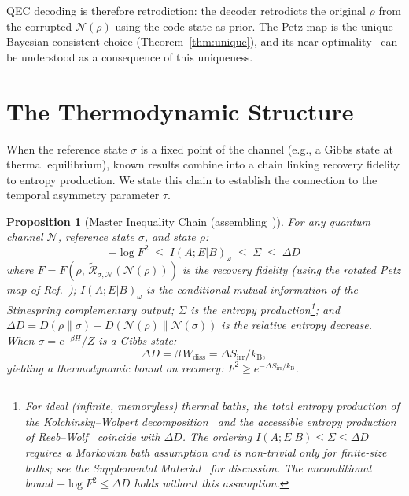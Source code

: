 \documentclass[prl,twocolumn,superscriptaddress,longbibliography,floatfix]{revtex4-2}
\newtheorem*{proposition}{Proposition}
\newcommand{\kB}{k_{\mathrm{B}}}
\newcommand{\Petz}{\mathcal{R}}
\newcommand{\chan}{\mathcal{N}}
\newcommand{\tauasym}{\tau}
\begin{document}
QEC decoding is therefore retrodiction: the decoder
retrodicts the original $\rho$ from the corrupted
$\chan(\rho)$ using the code state as prior.  The Petz map is the
unique Bayesian-consistent choice
(Theorem~\ref{thm:unique}), and its
near-optimality~\cite{Barnum2002} can be understood as a
consequence of this uniqueness.

\section{The Thermodynamic Structure}
\label{sec:thermo}

When the reference state $\sigma$ is a fixed point of the channel
(e.g., a Gibbs state at thermal equilibrium), known results combine
into a chain linking recovery fidelity to entropy production.  We
state this chain to establish the connection to the temporal
asymmetry parameter $\tauasym$.

\begin{proposition}[Master Inequality Chain
  (assembling~\cite{Junge2018,Fawzi2015,Kolchinsky2017,ReebWolf2014})]
\label{thm:master}
For any quantum channel $\chan$, reference state $\sigma$, and state
$\rho$:
\begin{equation}
\boxed{
-\!\log F^2 \;\leq\; I(A;E|B)_\omega
\;\leq\; \Sigma
\;\leq\; \Delta D
}
\label{eq:master}
\end{equation}
where $F = F(\rho,\,\tilde{\Petz}_{\sigma,\chan}(\chan(\rho)))$ is the recovery
fidelity (using the rotated Petz map of Ref.~\cite{Junge2018}); $I(A;E|B)_\omega$ is the conditional mutual information of
the Stinespring complementary output; $\Sigma$ is the entropy production\footnote{For
ideal (infinite, memoryless) thermal baths, the total entropy production
of the Kolchinsky--Wolpert decomposition~\cite{Kolchinsky2017} and the
accessible entropy production of Reeb--Wolf~\cite{ReebWolf2014} coincide
with $\Delta D$.  The ordering $I(A;E|B) \leq \Sigma \leq \Delta D$
requires a Markovian bath assumption and is non-trivial only for
finite-size baths; see the Supplemental Material~\cite{SM} for
discussion.  The unconditional bound $-\!\log F^2 \leq \Delta D$
holds without this assumption.}; and
$\Delta D = D(\rho\|\sigma) - D(\chan(\rho)\|\chan(\sigma))$ is the
relative entropy decrease. When $\sigma = e^{-\beta H}/Z$ is a Gibbs
state:
\begin{equation}
\Delta D = \beta\, W_{\mathrm{diss}} = \Delta S_{\mathrm{irr}}/\kB,
\label{eq:gibbs}
\end{equation}
yielding a thermodynamic bound on recovery:
$F^2 \geq e^{-\Delta S_{\mathrm{irr}}/\kB}$.
\end{proposition}
\end{document}

